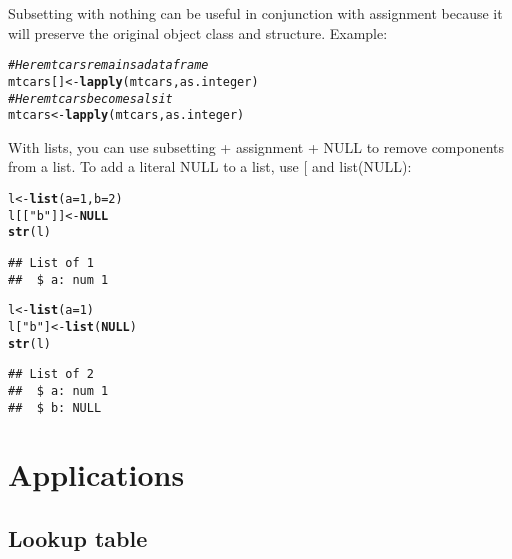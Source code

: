 \documentclass{article}\usepackage[]{graphicx}\usepackage[]{color}
\makeatletter
\newcommand{\hlnum}[1]{\textcolor[rgb]{0.686,0.059,0.569}{#1}}%
\newcommand{\hlstr}[1]{\textcolor[rgb]{0.192,0.494,0.8}{#1}}%
\newcommand{\hlcom}[1]{\textcolor[rgb]{0.678,0.584,0.686}{\textit{#1}}}%
\newcommand{\hlstd}[1]{\textcolor[rgb]{0.345,0.345,0.345}{#1}}%
\newcommand{\hlkwa}[1]{\textcolor[rgb]{0.161,0.373,0.58}{\textbf{#1}}}%
\newcommand{\hlkwb}[1]{\textcolor[rgb]{0.69,0.353,0.396}{#1}}%
\newcommand{\hlkwc}[1]{\textcolor[rgb]{0.333,0.667,0.333}{#1}}%
\newcommand{\hlkwd}[1]{\textcolor[rgb]{0.737,0.353,0.396}{\textbf{#1}}}%
\newenvironment{kframe}{%
 \def\at@end@of@kframe{}%
 \ifinner\ifhmode%
  \def\at@end@of@kframe{\end{minipage}}%
  \begin{minipage}{\columnwidth}%
 \fi\fi%
 \def\FrameCommand##1{\hskip\@totalleftmargin \hskip-\fboxsep
 \colorbox{shadecolor}{##1}\hskip-\fboxsep
     \hskip-\linewidth \hskip-\@totalleftmargin \hskip\columnwidth}%
 \MakeFramed {\advance\hsize-\width
   \@totalleftmargin\z@ \linewidth\hsize
   \@setminipage}}%
 {\par\unskip\endMakeFramed%
 \at@end@of@kframe}
\newenvironment{knitrout}{}{} %
\makeatother
\begin{document}
Subsetting with nothing can be useful in conjunction with assignment because it will preserve the original object class and structure. Example:

\begin{knitrout}
\color{fgcolor}\begin{kframe}
\begin{alltt}
\hlcom{# Here mtcars remains a data frame}
\hlstd{mtcars[]} \hlkwb{<-} \hlkwd{lapply}\hlstd{(mtcars, as.integer)}
\hlcom{# Here mtcars becomes a lsit}
\hlstd{mtcars} \hlkwb{<-} \hlkwd{lapply}\hlstd{(mtcars, as.integer)}
\end{alltt}
\end{kframe}
\end{knitrout}

With lists, you can use subsetting + assignment + NULL to remove components from a list. To add a literal NULL to a list, use [ and list(NULL):
\begin{knitrout}
\color{fgcolor}\begin{kframe}
\begin{alltt}
\hlstd{l} \hlkwb{<-} \hlkwd{list}\hlstd{(}\hlkwc{a}\hlstd{=}\hlnum{1}\hlstd{,} \hlkwc{b}\hlstd{=}\hlnum{2}\hlstd{)}
\hlstd{l[[}\hlstr{"b"}\hlstd{]]} \hlkwb{<-} \hlkwa{NULL}
\hlkwd{str}\hlstd{(l)}
\end{alltt}
\begin{verbatim}
## List of 1
##  $ a: num 1
\end{verbatim}
\begin{alltt}
\hlstd{l} \hlkwb{<-} \hlkwd{list}\hlstd{(}\hlkwc{a}\hlstd{=}\hlnum{1}\hlstd{)}
\hlstd{l[}\hlstr{"b"}\hlstd{]} \hlkwb{<-} \hlkwd{list}\hlstd{(}\hlkwa{NULL}\hlstd{)}
\hlkwd{str}\hlstd{(l)}
\end{alltt}
\begin{verbatim}
## List of 2
##  $ a: num 1
##  $ b: NULL
\end{verbatim}
\end{kframe}
\end{knitrout}

\section{Applications}

\subsection{Lookup table}
\end{document}
